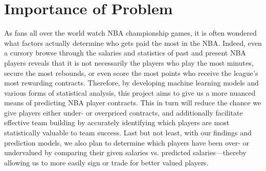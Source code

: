 \documentclass{article}
\begin{document}
\section*{Importance of Problem}

As fans all over the world watch NBA championship games, it is often wondered what factors actually determine who gets paid the most in the NBA.  Indeed, even a cursory browse through the salaries and statistics of past and present NBA players reveals that it is not necessarily the players who play the most minutes, secure the most rebounds, or even score the most points who receive the league's most rewarding contracts. Therefore, by developing machine learning models and various forms of statistical analysis, this project aims to give us a more nuanced means of predicting NBA player contracts. This in turn will reduce the chance we give players either under- or overpriced contracts, and additionally facilitate effective team building by accurately identifying which players are most statistically valuable to team success. Last but not least, with our findings and prediction models, we also plan to determine which players have been over- or undervalued by comparing their given salaries vs. predicted salaries—thereby allowing us to more easily sign or trade for better valued players.
\end{document}

